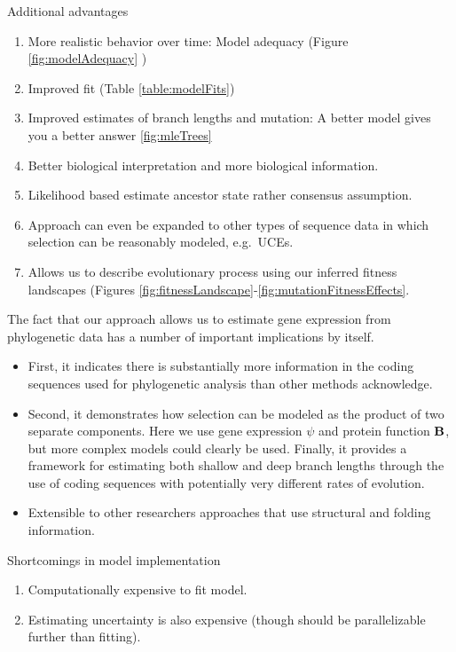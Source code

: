 \documentclass{article}
\newcommand{\Func}{\ensuremath{\text{\textbf{B}}}\xspace}
\begin{document}
Additional advantages
\begin{enumerate}
\item More realistic behavior over time: Model adequacy (Figure \ref{fig:modelAdequacy} )
\item Improved fit (Table \ref{table:modelFits})
\item Improved estimates of branch lengths and mutation: A better model gives you a better answer \ref{fig:mleTrees}
\item Better biological interpretation and more biological information.
\item Likelihood based estimate ancestor state rather consensus assumption.
\item Approach can even be expanded to other types of sequence data in which selection can be reasonably modeled, e.g.~UCEs.
\item Allows us to describe evolutionary process using our inferred fitness landscapes (Figures \ref{fig:fitnessLandscape}-\ref{fig:mutationFitnessEffects}.
\end{enumerate}


The fact that our approach allows us to estimate gene expression from phylogenetic data has a number of important implications by itself.
\begin{itemize}
\item First, it indicates there is substantially more information in the coding sequences used for phylogenetic analysis than other methods acknowledge.
\item Second, it demonstrates how selection can be modeled as the product of two separate components.
  Here we use gene expression $\psi$ and protein function \Func, but more complex models could clearly be used.  Finally, it provides a framework for estimating both shallow and deep branch lengths through the use of coding sequences with potentially very different rates of evolution.
\item Extensible to other researchers approaches that use structural and folding  information.
\end{itemize}

Shortcomings in model implementation
\begin{enumerate}
\item Computationally expensive to fit model.
\item Estimating uncertainty is also expensive (though should be parallelizable further than fitting).
  \end{enumerate}
\end{document}
